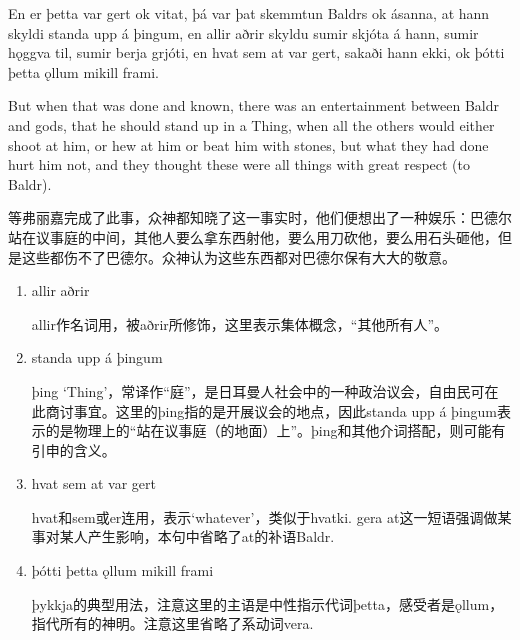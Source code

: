 \begin{paracol}{2}
  En er þetta var gert ok vitat, þá var þat skemmtun Baldrs ok ásanna, at hann skyldi standa upp á þingum, en allir aðrir skyldu sumir skjóta á hann, sumir hǫggva til, sumir berja grjóti, en hvat sem at var gert, sakaði hann ekki, ok þótti þetta ǫllum mikill frami.

  \switchcolumn

  But when that was done and known, there was an entertainment between Baldr and gods, that he should stand up in a Thing, when all the others would either shoot at him, or hew at him or beat him with stones, but what they had done hurt him not, and they thought these were all things with great respect (to Baldr).
\end{paracol}
\begin{translation*}{}
  等弗丽嘉完成了此事，众神都知晓了这一事实时，他们便想出了一种娱乐：巴德尔站在议事庭的中间，其他人要么拿东西射他，要么用刀砍他，要么用石头砸他，但是这些都伤不了巴德尔。众神认为这些东西都对巴德尔保有大大的敬意。
\end{translation*}
\begin{grammar*}{}
  \begin{enumerate}[leftmargin=*]
    \item allir aðrir

          allir作名词用，被aðrir所修饰，这里表示集体概念，“其他所有人”。
    \item standa upp á þingum

          þing `Thing'，常译作“庭”，是日耳曼人社会中的一种政治议会，自由民可在此商讨事宜。这里的þing指的是开展议会的地点，因此standa upp á þingum表示的是物理上的“站在议事庭（的地面）上”。þing和其他介词搭配，则可能有引申的含义。

    \item hvat sem at var gert

          hvat和sem或er连用，表示`whatever'，类似于hvatki. gera at这一短语强调做某事对某人产生影响，本句中省略了at的补语Baldr.

    \item þótti þetta ǫllum mikill frami

          þykkja的典型用法，注意这里的主语是中性指示代词þetta，感受者是ǫllum，指代所有的神明。注意这里省略了系动词vera.
  \end{enumerate}
\end{grammar*}

